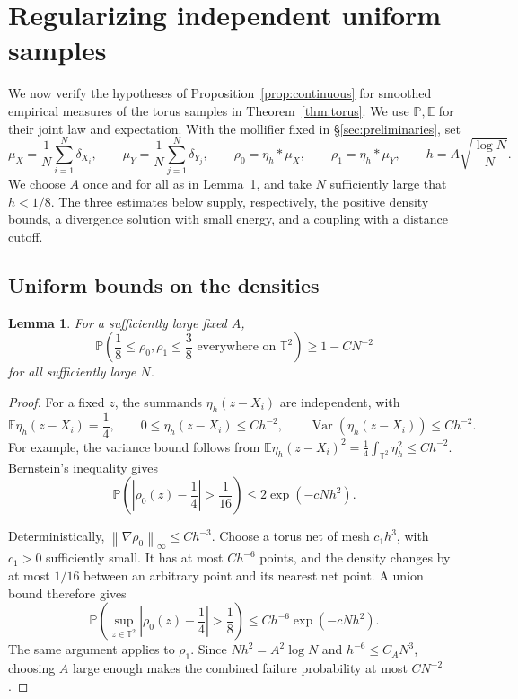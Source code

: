 \documentclass[11pt]{article}
\newcommand{\Pbb}{\mathbb P}
\newcommand{\Ebb}{\mathbb E}
\newcommand{\T}{\mathbb T^2}
\newcommand{\Var}{\operatorname{Var}}
\newcommand{\norm}[1]{\left\lVert #1\right\rVert}
\newtheorem{lemma}[theorem]{Lemma}
\theoremstyle{remark}
\numberwithin{equation}{section}
\begin{document}
\section{Regularizing independent uniform samples}
\label{sec:random-inputs}

We now verify the hypotheses of Proposition~\ref{prop:continuous} for
smoothed empirical measures of the torus samples in
Theorem~\ref{thm:torus}. We use \(\Pbb,\Ebb\) for their joint law
and expectation. With the mollifier fixed in
\S\ref{sec:preliminaries}, set
\[
 \mu_X=\frac1N\sum_{i=1}^N\delta_{X_i},\qquad
 \mu_Y=\frac1N\sum_{j=1}^N\delta_{Y_j},\qquad
 \rho_0=\eta_h*\mu_X,\qquad
 \rho_1=\eta_h*\mu_Y,
 \qquad
 h=A\sqrt{\frac{\log N}{N}}.
\]
We choose \(A\) once and for all as in Lemma~\ref{lem:density}, and
take \(N\) sufficiently large that \(h<1/8\). The three estimates
below supply, respectively, the positive density bounds, a divergence
solution with small energy, and a coupling with a distance cutoff.

\subsection{Uniform bounds on the densities}

\begin{lemma}
\label{lem:density}
For a sufficiently large fixed \(A\),
\[
 \Pbb\left(\frac18\le\rho_0,\rho_1\le\frac38
 \text{ everywhere on }\T\right)\ge1-CN^{-2}
\]
for all sufficiently large \(N\).
\end{lemma}

\begin{proof}
For a fixed \(z\), the summands \(\eta_h(z-X_i)\) are independent,
with
\[
 \Ebb\eta_h(z-X_i)=\frac14,\qquad
 0\le\eta_h(z-X_i)\le Ch^{-2},\qquad
 \Var(\eta_h(z-X_i))\le Ch^{-2}.
\]
For example, the variance bound follows from
\(\Ebb\eta_h(z-X_i)^2=\frac14\int_{\T}\eta_h^2\le Ch^{-2}\).
Bernstein's inequality gives
\[
 \Pbb\left(\left|\rho_0(z)-\frac14\right|>\frac1{16}\right)
 \le 2\exp(-cNh^2).
\]

Deterministically, \(\norm{\nabla\rho_0}_\infty\le Ch^{-3}\).
Choose a torus net of mesh \(c_1h^3\), with \(c_1>0\) sufficiently
small. It has at most \(Ch^{-6}\) points, and the density changes
by at most \(1/16\) between an arbitrary point and its nearest
net point. A union bound therefore gives
\[
 \Pbb\left(\sup_{z\in\T}
 \left|\rho_0(z)-\frac14\right|>\frac18\right)
 \le Ch^{-6}\exp(-cNh^2).
\]
The same argument applies to \(\rho_1\). Since
\(Nh^2=A^2\log N\) and \(h^{-6}\le C_A N^3\), choosing \(A\)
large enough makes the combined failure probability at most
\(CN^{-2}\).
\end{proof}
\end{document}
